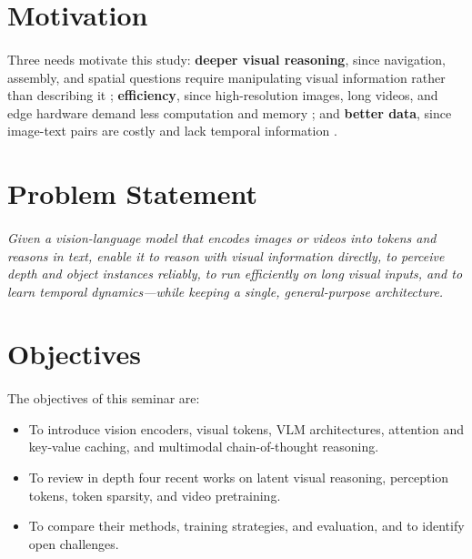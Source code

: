 \documentclass[12pt,a4paper,final]{extreport}
\begin{document}
\section{Motivation}

\paragraph{} Three needs motivate this study: \textbf{deeper visual reasoning}, since navigation, assembly, and spatial questions require manipulating visual information rather than describing it \cite{p1,p2}; \textbf{efficiency}, since high-resolution images, long videos, and edge hardware demand less computation and memory \cite{p3}; and \textbf{better data}, since image-text pairs are costly and lack temporal information \cite{p4}.

\section{Problem Statement}

\paragraph{} \emph{Given a vision-language model that encodes images or videos into tokens and reasons in text, enable it to reason with visual information directly, to perceive depth and object instances reliably, to run efficiently on long visual inputs, and to learn temporal dynamics---while keeping a single, general-purpose architecture.}

\section{Objectives}

\paragraph{} The objectives of this seminar are:
\begin{itemize}
  \item To introduce vision encoders, visual tokens, VLM architectures, attention and key-value caching, and multimodal chain-of-thought reasoning.
  \item To review in depth four recent works on latent visual reasoning, perception tokens, token sparsity, and video pretraining.
  \item To compare their methods, training strategies, and evaluation, and to identify open challenges.
\end{itemize}
\end{document}
